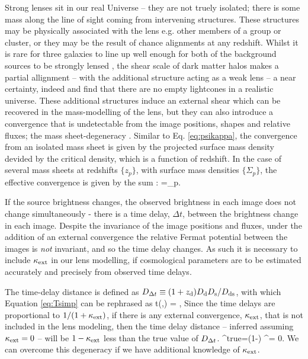\documentclass[useAMS,usenatbib]{mn2e}
\begin{document}
Strong lenses sit in our real Universe -- they are not truely isolated;
there is some mass along the line of sight coming from intervening structures.
These structures may be physically associated with the lens e.g. other members
of a group or cluster, or they may be the result of chance alignments at any redshift. 
Whilst it is rare for three galaxies to line up well enough for both of the background sources
to be strongly lensed \citep{gavazzi2008,collett2012}, the shear scale of dark matter halos
makes a partial allignment -- with the additional structure acting as a weak lens -- 
a near certainty, indeed \citet{valewhite2003} and \citet{hilbert2007} find that there
are no empty lightcones in a realistic universe. These additional structures induce an external shear
which can be recovered in the mass-modelling of the lens, but they can also introduce a convergence that
is undetectable from the image positions, shapes and relative fluxes; the mass sheet-degeneracy \citep[see e.g.][for details]{Falco1985,Schneider2006}. Similar to Eq. \ref{eq:psikappa}, the convergence from an isolated mass sheet is given by the projected surface mass density devided by the critical density, which is a function of redshift. 
In the case of several mass sheets at redshifts $\{z_p\}$, with surface mass densities $\{\Sigma_p\}$, the effective convergence is given by the  sum :
\be \label{eq:kappasum}
\kappax=\sum_p.
\ee

If the source brightness changes, the observed brightness in each image does not change
simultaneously - there is a time delay, $\Delta t$, between the brightness change in
each image. Despite the invariance of the image positions and fluxes, under the addition
of an external convergence the relative Fermat potential between the images is {\it not}
invariant, and so the time delay changes. As such it is necessary to include $\kappa_{\rm ext}$
in our lens modelling, if cosmological parameters are to be estimated accurately and
precisely \citep{suyu2010} from observed time delays.

The time-delay distance is defined as $D_{\Delta t} \equiv (1+z_{\rm d}) D_{\rm d} D_{\rm s}/D_{\rm ds}$,
with which Equation \ref{eq:Tsimp} can be rephrased as
\be
\Delta t(\bmath{\theta},\bmath{\beta})  =  ,
\ee 
Since the time delays are proportional to $1/ (1+ \kappa_{\rm ext})$, if there is any external convergence, $\kappa_{\rm ext}$, that is not included in the lens
modeling, then the time delay distance -- inferred assuming $\kappa_{\rm ext} = 0$ -- will be
$1-\kappa_{\rm ext}$ less than the true value of $D_{\Delta t}$.
\be 
\label{eq:MassSheet:H0bias}
\Dt^{\rm{true}}=(1-\kappax) \Dt^{{\kappax = 0}}.
\ee
We can overcome this degeneracy if we have additional knowledge of $\kappa_{\rm ext}$.
\end{document}
